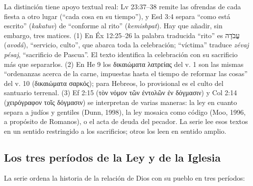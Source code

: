 \documentclass[11pt,letterpaper]{article}
\newcommand{\heb}[1]{\mbox{\foreignlanguage{hebrew}{#1}}}
\newcommand{\grc}[1]{\foreignlanguage{ancientgreek}{#1}}
\begin{document}
\begin{nota}[Precisión]
La distinción tiene apoyo textual real: Lv 23:37--38 remite las ofrendas de cada fiesta a otro lugar (``cada cosa en su tiempo''), y Esd 3:4 separa ``como está escrito'' (\emph{kakatuv}) de ``conforme al rito'' (\emph{kemishpat}). Hay que añadir, sin embargo, tres matices. (1) En Éx 12:25--26 la palabra traducida ``rito'' es \heb{עֲבֹדָה} (\emph{avodá}), ``servicio, culto'', que abarca toda la celebración; ``víctima'' traduce \emph{zévaj pésaj}, ``sacrificio de Pascua''. El texto identifica la celebración con su sacrificio más que separarlos. (2) En He 9 los \grc{δικαιώματα λατρείας} del v. 1 son las mismas ``ordenanzas acerca de la carne, impuestas hasta el tiempo de reformar las cosas'' del v. 10 (\grc{δικαιώματα σαρκός}); para Hebreos, lo provisional es el culto del santuario terrenal. (3) Ef 2:15 (\grc{τὸν νόμον τῶν ἐντολῶν ἐν δόγμασιν}) y Col 2:14 (\grc{χειρόγραφον τοῖς δόγμασιν}) se interpretan de varias maneras: la ley en cuanto separa a judíos y gentiles (Dunn, 1998), la ley mosaica como código (Moo, 1996, a propósito de Romanos), o el acta de deuda del pecador. La serie lee esos textos en un sentido restringido a los sacrificios; otros los leen en sentido amplio.
\end{nota}

\subsection{Los tres períodos de la Ley y de la Iglesia}
La serie ordena la historia de la relación de Dios con su pueblo en tres períodos:
\end{document}

